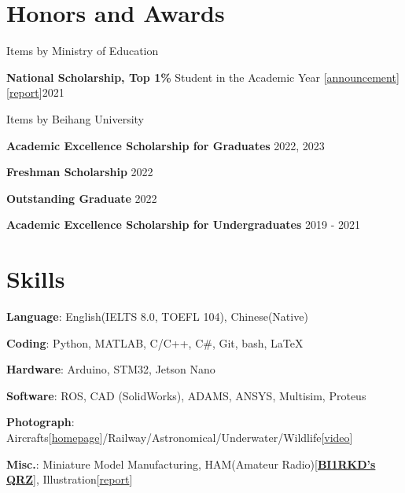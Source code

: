 \documentclass[11pt, a4paper]{article}
\begin{document}
\section*{Honors and Awards}
{\large Items by Ministry of Education}
\begin{researchitem}
    \item \textbf{National Scholarship, Top 1\%} Student in the Academic Year [\href{http://www.moe.gov.cn/jyb_xxgk/s5743/s5744/A05/202112/t20211216_587869.html?eqid=b2fb374f0000822f00000006642bbf42}{announcement}][\href{https://mp.weixin.qq.com/s?__biz=MzAwMzc1ODI3OA==&mid=2653101972&idx=1&sn=c79155042659a08cdac06066c9ac560b&chksm=80e1fe3db796772b47990fd985978f2c0a8a1a85bb218c9d13621389e85553d18d5e6d15b160&scene=27}{report}]\hfill 2021\end{researchitem} 
{\large Items by Beihang University}
\begin{researchitem}
    \item \textbf{Academic Excellence Scholarship for Graduates}  \hfill 2022, 2023 
    \item \textbf{Freshman Scholarship} \hfill 2022 
    \item \textbf{Outstanding Graduate}  \hfill 2022 
    \item \textbf{Academic Excellence Scholarship for Undergraduates} \hfill 2019 - 2021\end{researchitem}

\section*{Skills}
\begin{researchitem}
    \item \textbf{Language}: English(IELTS 8.0, TOEFL 104), Chinese(Native)
    \item \textbf{Coding}: Python, MATLAB, C/C++, C\#, Git, bash, \LaTeX\
    \item\textbf{Hardware}: Arduino, STM32, Jetson Nano 
    \item\textbf{Software}: ROS, CAD (SolidWorks),  ADAMS, ANSYS, Multisim, Proteus
    \item \textbf{Photograph}: Aircrafts[\href{https://www.jetphotos.com/photo/10139715}{homepage}]/Railway/Astronomical/Underwater/Wildlife[\href{https://www.bilibili.com/video/BV1CG411a72H/}{video}]
    \item \textbf{Misc.}: Miniature Model Manufacturing, HAM(Amateur Radio)[\href{https://www.qrz.com/db/BI1RKD}{\textbf{BI1RKD's QRZ}}], Illustration[\href{   https://mp.weixin.qq.com/s?__biz=MzA5NzQwMjUzMg==&mid=2650807040&idx=2&sn=bfb5078ea49efadd808ab9ebf40a7a2e&chksm=8b55d0cbbc2259dde8517b283b31ceddaba474eb58a527b2267d67eff4ba0998e4c35001b6d9&scene=27}{report}]
    \end{researchitem}
\end{document}
